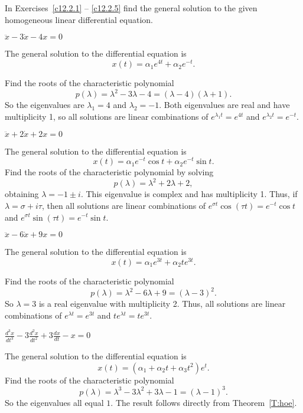 \documentclass{ximera}
\begin{document}
\noindent In Exercises~\ref{c12.2.1} -- \ref{c12.2.5} find the general 
solution to the given homogeneous linear differential equation.
\begin{exercise} \label{c12.2.1}
$\ddot{x}-3\dot{x}-4x = 0$

\begin{solution}
\ans The general solution to the differential equation is
\[
x(t) = \alpha_1e^{4t} + \alpha_2e^{-t}.
\]

\soln Find the roots of the characteristic polynomial
\[
p(\lambda) = \lambda^2 - 3\lambda - 4 = (\lambda - 4)(\lambda + 1).
\]
So the eigenvalues are $\lambda_1 = 4$ and $\lambda_2 = -1$.  Both eigenvalues
are real and have multiplicity 1, so all solutions are linear combinations of
$e^{\lambda_1 t} = e^{4t}$ and $e^{\lambda_2 t} = e^{-t}$.


\end{solution}
\end{exercise}
\begin{exercise} \label{c12.2.2}
$\ddot{x}+2\dot{x}+2x = 0$

\begin{solution}
\ans The general solution to the differential equation is
\[
x(t) = \alpha_1e^{-t}\cos t + \alpha_2e^{-t}\sin t.
\]
\soln Find the roots of the characteristic polynomial by solving
\[
p(\lambda) = \lambda^2 + 2\lambda + 2,
\]
obtaining $\lambda = -1 \pm i$.  This eigenvalue is complex and has
multiplicity 1.  Thus, if $\lambda = \sigma + i\tau$, then all
solutions are linear combinations of $e^{\sigma t}\cos(\tau t) =
e^{-t}\cos t$ and $e^{\sigma t}\sin(\tau t) = e^{-t}\sin t$.

\end{solution}
\end{exercise}
\begin{exercise} \label{c12.2.3}
$\ddot{x}-6\dot{x}+9x = 0$

\begin{solution}
\ans The general solution to the differential equation is
\[
x(t) = \alpha_1e^{3t} + \alpha_2te^{3t}.
\]

\soln Find the roots of the characteristic polynomial
\[
p(\lambda) = \lambda^2 - 6\lambda + 9 = (\lambda - 3)^2.
\]
So $\lambda = 3$ is a real eigenvalue with multiplicity 2.  Thus, all
solutions are linear combinations of $e^{\lambda t} = e^{3t}$ and
$te^{\lambda t} = te^{3t}$.

\end{solution}
\end{exercise}
\begin{exercise} \label{c12.2.4}
$\frac{d^3x}{dt^3} -3\frac{d^2x}{dt^2}+3\frac{dx}{dt}-x=0$

\begin{solution}
\ans The general solution to the differential equation is
\[
x(t) = (\alpha_1+\alpha_2 t + \alpha_3 t^2) e^t.
\]
\soln Find the roots of the characteristic polynomial
\[
p(\lambda) = \lambda^3 - 3\lambda^2 + 3\lambda - 1 = (\lambda - 1)^3.
\]
So the eigenvalues all equal $1$.  The result follows directly from
Theorem~\ref{T:hoe}.

\end{solution}
\end{exercise}
\end{document}
